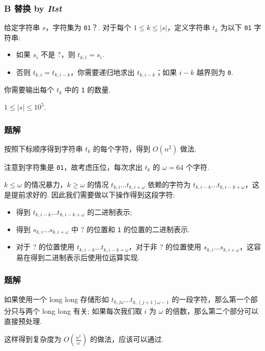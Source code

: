 \frame
{
  \frametitle{B 替换 {by \itshape Itst}}

	给定字符串 $s$，字符集为 \texttt{01}？. 对于每个 $1\le k\le |s|$，定义字符串 $t_k$ 为以下 \texttt{01} 字符串:
	\begin{itemize}
	\item 如果 $s_i$ 不是 ?，则 $t_{k,i}=s_i$.
	\item 否则 $t_{k,i}=t_{k,i-k}$，你需要递归地求出 $t_{k,i-k}$；如果 $i-k$ 越界则为 \texttt{0}.
	\end{itemize}

	你需要输出每个 $t_k$ 中的 \texttt{1} 的数量.

	$1\le |s|\le 10^5$.

}

\frame
{
  \frametitle{题解}

	按照下标顺序得到字符串 $t_k$ 的每个字符，得到 $O(n^2)$ 做法. \pause

	注意到字符集是 \texttt{01}，故考虑压位，每次求出 $t_k$ 的 $\omega=64$ 个字符. \pause

	$k\le \omega$ 的情况暴力，$k\ge \omega$ 的情况 $t_{k,i}\dots t_{k,i+\omega}$ 依赖的字符为 $t_{k,i-k}\dots t_{k,i-k+\omega}$，这是提前求好的. 因此我们需要做以下操作得到这段字符: \pause

	\begin{itemize}
	\item 得到 $t_{k,i-k}\dots t_{k,i-k+\omega}$ 的二进制表示; \pause
	\item 得到 $s_{k,i}\dots s_{k,i+\omega}$ 中 ? 的位置和 \texttt{1} 的位置的二进制表示. \pause
	\item 对于 ? 的位置使用 $t_{k,i-k}\dots t_{k,i-k+\omega}$，对于非 ? 的位置使用 $s_{k,i}\dots s_{k,i+\omega}$，这容易在得到二进制表示后使用位运算实现.
	\end{itemize}

}

\frame
{
  \frametitle{题解}

	如果使用一个 long long 存储形如 $t_{k,j\omega}\dots t_{k,(j+1)\omega-1}$ 的一段字符，那么第一个部分只与两个 long long 有关; 如果每次我们取 $i$ 为 $\omega$ 的倍数，那么第二个部分可以直接预处理. \pause

	这样得到复杂度为 $O\left(\frac{n^2}{\omega}\right)$ 的做法，应该可以通过.

}
